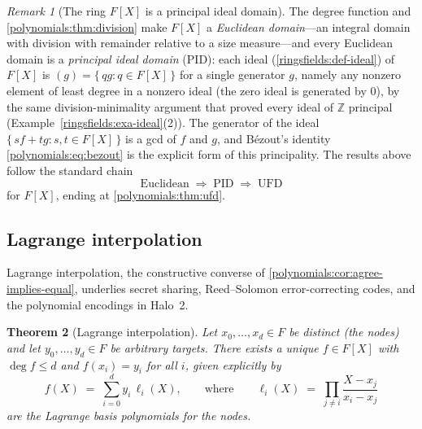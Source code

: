 \documentclass[11pt,a4paper]{article}
\newtheorem{theorem}{Theorem}[section]
\theoremstyle{definition}
\theoremstyle{remark}
\newtheorem{remark}[theorem]{Remark}
\newcommand{\Z}{\ensuremath{\mathbb{Z}}}
\begin{document}
\begin{remark}[{The ring \(F[X]\) is a principal ideal domain}]
\label{polynomials:rem:pid}
The degree function and \cref{polynomials:thm:division} make \(F[X]\) a
\emph{Euclidean
domain}---an integral domain with division with
remainder relative to a size measure---and every Euclidean domain is a
\emph{principal ideal domain} (PID): each ideal
(\cref{ringsfields:def-ideal}) of \(F[X]\) is
\((g) = \{\,qg : q \in F[X]\,\}\) for a single generator \(g\), namely
any nonzero element of least degree in a nonzero ideal (the zero ideal
is generated by \(0\)), by the same
division-minimality argument that proved every ideal of \(\Z\)
principal (Example~\ref{ringsfields:exa-ideal}(2)). The generator of the
ideal \(\{\,sf + tg : s,t \in F[X]\,\}\) is a gcd of \(f\) and \(g\),
and B\'ezout's identity \eqref{polynomials:eq:bezout} is the explicit
form of this principality. The results above follow the standard chain
\[
\text{Euclidean} \;\Longrightarrow\; \text{PID}
\;\Longrightarrow\; \text{UFD}
\]
for \(F[X]\), ending at \cref{polynomials:thm:ufd}.
\end{remark}
\subsection{Lagrange interpolation}\label{polynomials:sub:lagrange}

Lagrange interpolation, the constructive converse of
\cref{polynomials:cor:agree-implies-equal}, underlies secret sharing,
Reed--Solomon error-correcting codes, and the polynomial encodings in
Halo~2.

\begin{theorem}[Lagrange interpolation]\label{polynomials:thm:lagrange}
Let \(x_0, \dots, x_d \in F\) be distinct (the \emph{nodes}) and let
\(y_0, \dots, y_d \in F\) be arbitrary targets. There exists a unique
\(f \in F[X]\) with \(\deg f \le d\) and \(f(x_i) = y_i\) for all
\(i\), given explicitly by
\[
f(X) \;=\; \sum_{i=0}^{d} y_i\, \ell_i(X),
\qquad\text{where}\qquad
\ell_i(X) \;=\; \prod_{j \neq i} \frac{X - x_j}{x_i - x_j}
\]
are the \emph{Lagrange basis polynomials} for the nodes.
\end{theorem}
\end{document}
